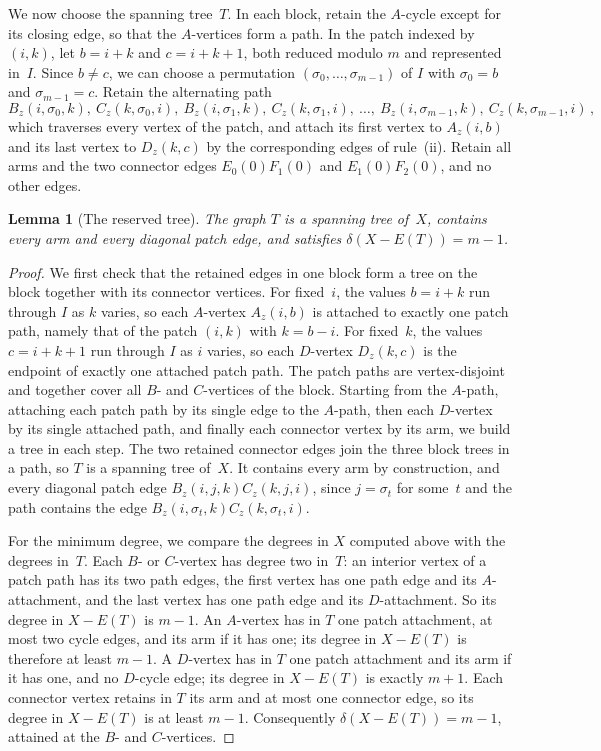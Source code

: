 \documentclass[11pt,letterpaper]{article}
\numberwithin{equation}{section}
\theoremstyle{plain}
\newtheorem{lemma}[theorem]{Lemma}
\theoremstyle{definition}
\theoremstyle{remark}
\begin{document}
We now choose the spanning tree~$T$. In each block, retain the $A$-cycle except for its closing edge, so that the $A$-vertices form a path. In the patch indexed by $(i,k)$, let $b=i+k$ and $c=i+k+1$, both reduced modulo $m$ and represented in~$I$. Since $b\ne c$, we can choose a permutation $(\sigma_0,\dots,\sigma_{m-1})$ of $I$ with $\sigma_0=b$ and $\sigma_{m-1}=c$. Retain the alternating path
\begin{equation*}
  B_z(i,\sigma_0,k),\ C_z(k,\sigma_0,i),\ B_z(i,\sigma_1,k),\ C_z(k,\sigma_1,i),\ \dots,\ B_z(i,\sigma_{m-1},k),\ C_z(k,\sigma_{m-1},i)\,,
\end{equation*}
which traverses every vertex of the patch, and attach its first vertex to $A_z(i,b)$ and its last vertex to $D_z(k,c)$ by the corresponding edges of rule~(ii). Retain all arms and the two connector edges $E_0(0)F_1(0)$ and $E_1(0)F_2(0)$, and no other edges.

\begin{lemma}[The reserved tree]\label{lem:tree}
The graph $T$ is a spanning tree of~$X$, contains every arm and every diagonal patch edge, and satisfies $\delta(X-E(T))=m-1$.
\end{lemma}

\begin{proof}
We first check that the retained edges in one block form a tree on the block together with its connector vertices. For fixed~$i$, the values $b=i+k$ run through $I$ as $k$ varies, so each $A$-vertex $A_z(i,b)$ is attached to exactly one patch path, namely that of the patch $(i,k)$ with $k=b-i$. For fixed~$k$, the values $c=i+k+1$ run through $I$ as $i$ varies, so each $D$-vertex $D_z(k,c)$ is the endpoint of exactly one attached patch path. The patch paths are vertex-disjoint and together cover all $B$- and $C$-vertices of the block. Starting from the $A$-path, attaching each patch path by its single edge to the $A$-path, then each $D$-vertex by its single attached path, and finally each connector vertex by its arm, we build a tree in each step. The two retained connector edges join the three block trees in a path, so $T$ is a spanning tree of~$X$. It contains every arm by construction, and every diagonal patch edge $B_z(i,j,k)C_z(k,j,i)$, since $j=\sigma_t$ for some~$t$ and the path contains the edge $B_z(i,\sigma_t,k)C_z(k,\sigma_t,i)$.

For the minimum degree, we compare the degrees in $X$ computed above with the degrees in~$T$. Each $B$- or $C$-vertex has degree two in~$T$: an interior vertex of a patch path has its two path edges, the first vertex has one path edge and its $A$-attachment, and the last vertex has one path edge and its $D$-attachment. So its degree in $X-E(T)$ is $m-1$. An $A$-vertex has in $T$ one patch attachment, at most two cycle edges, and its arm if it has one; its degree in $X-E(T)$ is therefore at least $m-1$. A $D$-vertex has in $T$ one patch attachment and its arm if it has one, and no $D$-cycle edge; its degree in $X-E(T)$ is exactly $m+1$. Each connector vertex retains in $T$ its arm and at most one connector edge, so its degree in $X-E(T)$ is at least $m-1$. Consequently $\delta(X-E(T))=m-1$, attained at the $B$- and $C$-vertices.
\end{proof}
\end{document}
